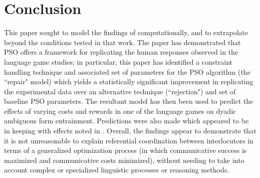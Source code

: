 \documentclass[12pt,a4paper]{article}
\begin{document}
\section{Conclusion}
This paper sought to model the findings of \citeauthor{rohde2012} computationally, and to extrapolate beyond the conditions tested in that work. The paper has demonstrated that PSO offers a framework for replicating the human responses observed in the \citeauthor{rohde2012} language game studies; in particular, this paper has identified a constraint handling technique and associated set of parameters for the PSO algorithm (the ``repair" model) which yields a statistically significant improvement in replicating the experimental data over an alternative technique (``rejection") and set of baseline PSO parameters. The resultant model has then been used to predict the effects of varying costs and rewards in one of the \citeauthor{rohde2012} language games on dyadic ambiguous form entrainment. Predictions were also made which appeared to be in keeping with effects noted in \citeauthor{brennan1996}. Overall, the findings appear to demonstrate that it is not unreasonable to explain referential coordination between interlocutors in terms of a generalized optimization process (in which communicative success is maximized and communicative costs minimized), without needing to take into account complex or specialized linguistic processes or reasoning methods.

\pagebreak


\end{document}
